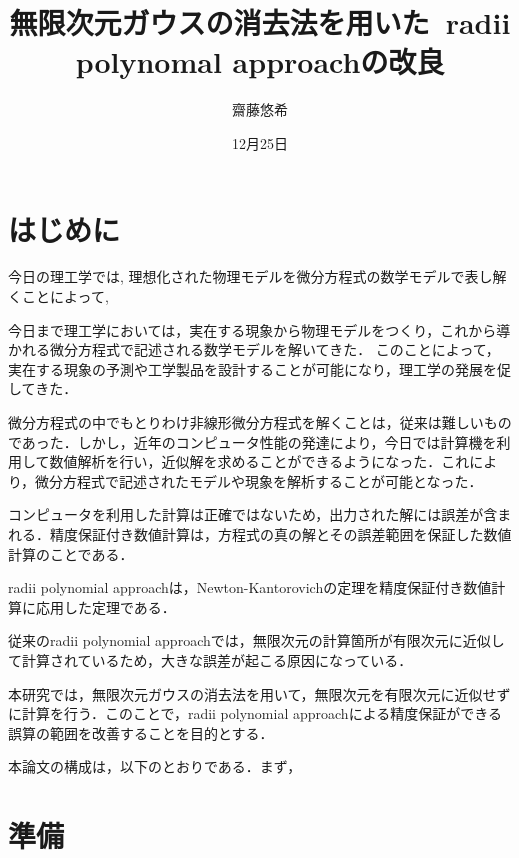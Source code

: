 \documentclass[11pt,a4paper,titlepage]{jsreport}
\title{無限次元ガウスの消去法を用いた\ radii polynomal approachの改良}
\author{齋藤悠希}
\date{12月25日}
\theoremstyle{definition}
\begin{document}

\pagestyle{empty}
\maketitle
\tableofcontents
\clearpage
\pagestyle{plain}


\chapter{はじめに}
今日の理工学では, 理想化された物理モデルを微分方程式の数学モデルで表し解くことによって,

今日まで理工学においては，実在する現象から物理モデルをつくり，これから導かれる微分方程式で記述される数学モデルを解いてきた．
このことによって，実在する現象の予測や工学製品を設計することが可能になり，理工学の発展を促してきた．\cite{}

微分方程式の中でもとりわけ非線形微分方程式を解くことは，従来は難しいものであった．しかし，近年のコンピュータ性能の発達により，今日では計算機を利用して数値解析を行い，近似解を求めることができるようになった．これにより，微分方程式で記述されたモデルや現象を解析することが可能となった．

コンピュータを利用した計算は正確ではないため，出力された解には誤差が含まれる．精度保証付き数値計算は，方程式の真の解とその誤差範囲を保証した数値計算のことである．

radii polynomial approachは，Newton-Kantorovichの定理を精度保証付き数値計算に応用した定理である．

従来のradii polynomial approachでは，無限次元の計算箇所が有限次元に近似して計算されているため，大きな誤差が起こる原因になっている．

本研究では，無限次元ガウスの消去法を用いて，無限次元を有限次元に近似せずに計算を行う．このことで，radii polynomial approachによる精度保証ができる誤算の範囲を改善することを目的とする．

本論文の構成は，以下のとおりである．まず，

\newpage
\chapter{準備}
\end{document}

